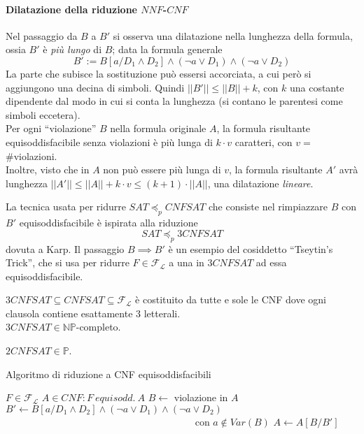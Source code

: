 \paragraph{Dilatazione della riduzione $NNF$-$CNF$}
Nel passaggio da $B$ a $B'$ si osserva una dilatazione nella lunghezza della formula, ossia $B'$ è \textit{più lungo} di $B$; data la formula 
generale 
$$
B' := B[a/D_1 \land D_2] \land (\neg a \lor D_1) \land (\neg a \lor D_2)
$$
La parte che subisce la sostituzione può essersi accorciata, a cui però si aggiungono una decina di simboli. Quindi $||B'|| \leq ||B|| + k$, con $k$ una costante dipendente dal modo in cui si conta la lunghezza (si contano le parentesi come simboli eccetera). \\
Per ogni ``violazione'' $B$ nella formula originale $A$, la formula risultante equisoddisfacibile senza violazioni è più lunga di $k \cdot v$ caratteri, con $v =$ \#violazioni. \\
Inoltre, visto che in $A$ non può essere più lunga di $v$, la formula risultante $A'$ avrà lunghezza $||A'|| \leq ||A|| + k \cdot v \leq (k + 1) \cdot ||A||$, una dilatazione \textit{lineare}.

La tecnica usata per ridurre $SAT \preceq_p CNFSAT$ che consiste nel rimpiazzare 
$B$ con $B'$ equisoddisfacibile è ispirata alla riduzione 
$$
SAT \preceq_p 3CNFSAT
$$
dovuta a Karp. Il passaggio $B \implies B'$ è un esempio del cosiddetto 
``Tseytin's Trick'', che si usa per ridurre $F \in \mathscr{F}_\mathscr{L}$ a una 
in $3CNFSAT$ ad essa equisoddisfacibile. 

\begin{defi}
$3CNFSAT \subseteq CNFSAT \subseteq \mathscr{F}_\mathscr{L}$ è costituito da tutte e sole le CNF dove ogni clausola contiene esattamente $3$ letterali. \\
$3CNFSAT \in \mathbb{NP}$-completo.
\end{defi}
\begin{oss}
        $2CNFSAT \in \mathbb{P}$.
\end{oss}
\begin{algorithm}
\caption{Algoritmo di riduzione a CNF equisoddisfacibili}
\begin{algorithmic} 
\REQUIRE $F \in \mathscr{F}_\mathscr{L}$
\ENSURE $A \in CNF : F\ equisodd.\ A$
\STATE $B \leftarrow$ violazione in $A$
\STATE $B' \leftarrow B[a/D_1 \land D_2] \land (\neg a \lor D_1) \land (\neg a \lor D_2)$ ~~~~~~~~~~~~~~~~~~~~~~~~~~~~~~~~~~~~~~ con $a \notin Var(B)$
\STATE $A \leftarrow A[B/B']$
\ENDWHILE
{}
\end{algorithmic}
\end{algorithm}


